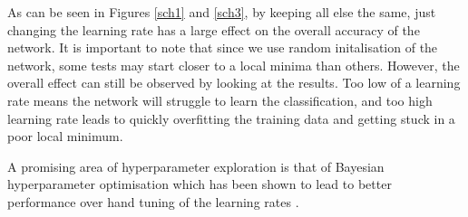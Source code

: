 \documentclass[12pt]{article}
\begin{document}
As can be seen in Figures \ref{sch1} and \ref{sch3}, by keeping all else the same, just changing the learning rate has a large effect on the overall accuracy of the network. It is important to note that since we use random initalisation of the network, some tests may start closer to a local minima than others. However, the overall effect can still be observed by looking at the results. Too low of a learning rate means the network will struggle to learn the classification, and too high learning rate leads to quickly overfitting the training data and getting stuck in a poor local minimum.

A promising area of hyperparameter exploration is that of Bayesian hyperparameter optimisation which has been shown to lead to better performance over hand tuning of the learning rates \cite{snoek2012practical, bayesian-optim}.
\end{document}
